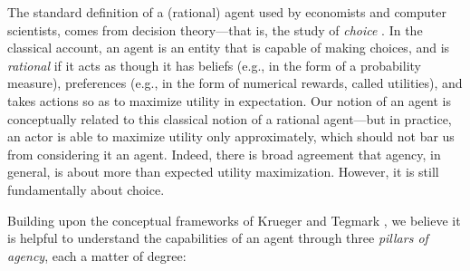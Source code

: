 The standard definition of a (rational) agent used by economists and computer scientists, comes from decision theory---that is, the study of \emph{choice} \cite{Savage.Foundations,ramsey1926truth,VnMR44theory-of-games-eb}. 
In the classical account, an agent is an entity that is capable of making choices, and is \textit{rational} if it acts as though it has beliefs (e.g., in the form of a probability measure), preferences (e.g., in the form of numerical rewards, called utilities), and takes actions so as to maximize utility in expectation.
Our notion of an agent is conceptually related to this classical notion of a rational agent---but in practice, an actor is able to maximize utility only approximately, which should not bar us from considering it an agent. 
Indeed, there is broad agreement that agency, in general, is about more than expected utility maximization. However, it is still fundamentally about choice.

Building upon the conceptual frameworks of Krueger \cite{neurips.cc.virtual.2024.workshop.84748} and Tegmark \cite{tegmark-pillars}, we believe it is helpful to understand the capabilities of an agent through three \emph{pillars of agency}, each a matter of degree:

